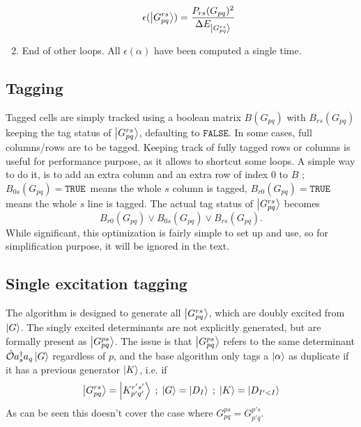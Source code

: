 \documentclass[./thesis.tex]{subfiles}
\begin{document}
\begin{enumerate}
\begin{equation}
\epsilon(\ket {G_{pq}^{rs}}) = \frac{P_{rs}(G_{pq})^2}{\Delta E_{\ket{G^{rs}_{pq}}}}
\end{equation}
\item
End of other loops. All $\epsilon(\alpha)$ have been computed a single time.

\end{enumerate}


\subsection{Tagging}

Tagged cells are simply tracked using a boolean matrix $B(G_{pq})$ with $B_{rs}(G_{pq})$ keeping the tag status of $\ket{G^{rs}_{pq}}$, defaulting to $\mathtt{FALSE}$. 
In some cases, full columns/rows are to be tagged. Keeping track of fully tagged rows or columns is useful for performance purpose, as it allows to shortcut some loops. A simple way to do it, is to add an extra column and an extra row of index $0$ to $B$ ; $B_{0s}(G_{pq}) = \mathtt{TRUE}\,$ means the whole $s$ column is tagged, $B_{r0}(G_{pq}) = \mathtt{TRUE}\,$ means the whole $s$ line is tagged. The actual tag status of $\ket{G^{rs}_{pq}}$ becomes
\begin{equation}
B_{r0}(G_{pq}) \vee B_{0s}(G_{pq}) \vee B_{rs}(G_{pq}).
\end{equation}
While significant, this optimization is fairly simple to set up and use, so for simplification purpose, it will be ignored in the text.


\subsection{Single excitation tagging}
\label{single_tagging}
The algorithm is designed to generate all $\ket {G_{pq}^{rs}}$, which are doubly excited from $\ket G$. The singly excited determinants are not explicitly generated, but are formally present as $\ket{G_{pq}^{ps}}$.
The issue is that $\ket{G_{pq}^{ps}}$ refers to the same determinant ${\hat{\mathcal{O}}} a^\dagger_s a_q \ket{G}$ regardless of $p$, and the base algorithm only tags a ${\ket{\alpha}}$ as duplicate if it has a previous generator $\ket K$, i.e. if
\begin{equation}
\ket {G_{pq}^{rs}} = \ket {K_{p'q'}^{r's'}} \; ; \; \ket G = \ket {D_I} \; ; \; \ket K = \ket {D_{I'<I}}
\end{equation}
As can be seen this doesn't cover the case where $G_{pq}^{ps} = G_{p'q}^{p's}$.
\end{document}
